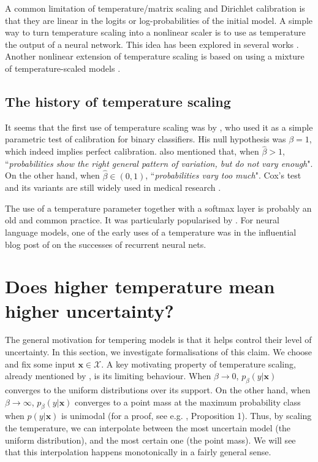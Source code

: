 \documentclass[10pt,dvipsnames]{article}
\newcommand{\bx}{\mathbf{x}}%
\theoremstyle{plain}
\theoremstyle{definition}
\theoremstyle{remark}
\begin{document}
A common limitation of temperature/matrix scaling and Dirichlet calibration is that they are linear in the logits or log-probabilities of the initial model. A simple way to turn temperature scaling into a nonlinear scaler is to use as temperature the output of a neural network. This idea has been explored in several works \citep{tian2020,tomani2022parameterized,joy2023sample}. Another nonlinear extension of temperature scaling is based on using a mixture of temperature-scaled models \citep{zhang2020mix}.

\subsection{The history of temperature scaling}

It seems that the first use of temperature scaling was by \citet{cox1958two}, who used it as a simple parametric test of calibration for binary classifiers. His null hypothesis was $\beta = 1$, which indeed implies perfect calibration. \citet{cox1958two} also mentioned that, when $\hat{\beta} > 1$, ``\textit{probabilities show the right general pattern of variation, but do not vary enough}". On the other hand, when $\hat{\beta} \in (0,1)$, ``\textit{probabilities vary too much}". Cox's \citeyearpar{cox1958two} test and its variants are still widely used in medical research \citep{stevens2020validation}.

The use of a temperature parameter together with a softmax layer is probably an old and common practice. It was particularly popularised by \citet{hinton2015distilling}. For neural language models, one of the early uses of a temperature was in the influential blog post of \citet{karpathyblog} on the successes of recurrent neural nets.
\section{Does higher temperature mean higher uncertainty?}
\label{sec:entropy}

The general motivation for tempering models is that it helps control their level of uncertainty. In this section, we investigate formalisations of this claim. We choose and fix some input $\bx \in \mathcal{X}$. A key motivating property of temperature scaling, already mentioned by \citet{guo2017calibration}, is its limiting behaviour. When $\beta \rightarrow 0$,  $p_\beta(y | \bx)$ converges to the uniform distributions over its support. On the other hand, when $ \beta \rightarrow \infty$, $p_\beta(y | \bx)$ converges to a point mass at the maximum probability class when $p(y | \bx)$ is unimodal (for a proof, see e.g. \citealp{girardin2016escort}, Proposition 1). Thus, by scaling the temperature, we can interpolate between the most uncertain model (the uniform distribution), and the most certain one (the point mass). We will see that this interpolation happens monotonically in a fairly general sense.
\end{document}
